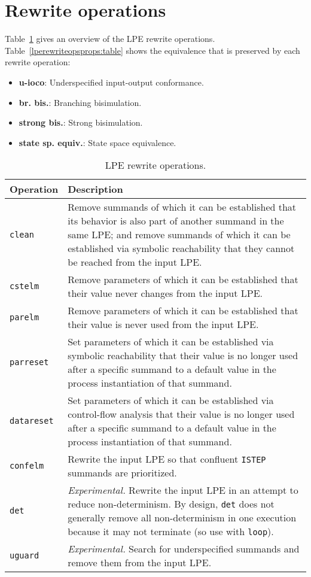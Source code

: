 \section{Rewrite operations}

Table~\ref{lperewriteops:table} gives an overview of the LPE rewrite operations.
Table~\ref{lperewriteopsprops:table} shows the equivalence that is preserved by each rewrite operation:
\begin{itemize}
\item \textbf{u-ioco}: Underspecified input-output conformance.
\item \textbf{br. bis.}: Branching bisimulation.
\item \textbf{strong bis.}: Strong bisimulation.
\item \textbf{state sp. equiv.}: State space equivalence.
\end{itemize}

\begin{table}[!ht]
\begin{center}
\begin{tabularx}{\linewidth}{l|X|}
\textbf{Operation} & \textbf{Description} \\ \hline
\texttt{clean} & Remove summands of which it can be established that its behavior is also part of another summand in the same LPE; and remove summands of which it can be established via symbolic reachability that they cannot be reached from the input LPE. \\ \hline
\texttt{cstelm} & Remove parameters of which it can be established that their value never changes from the input LPE. \\ \hline
\texttt{parelm} & Remove parameters of which it can be established that their value is never used from the input LPE. \\ \hline
\texttt{parreset} & Set parameters of which it can be established via symbolic reachability that their value is no longer used after a specific summand to a default value in the process instantiation of that summand. \\ \hline
\texttt{datareset} & Set parameters of which it can be established via control-flow analysis that their value is no longer used after a specific summand to a default value in the process instantiation of that summand. \\ \hline
\texttt{confelm} & Rewrite the input LPE so that confluent \texttt{ISTEP} summands are prioritized. \\ \hline
\texttt{det} & \textit{Experimental.} Rewrite the input LPE in an attempt to reduce non-determinism. By design, \texttt{det} does not generally remove all non-determinism in one execution because it may not terminate (so use with \texttt{loop}). \\ \hline
\texttt{uguard} & \textit{Experimental.} Search for underspecified summands and remove them from the input LPE. \\ \hline
\end{tabularx}
\caption{LPE rewrite operations.}
\label{lperewriteops:table}
\end{center}
\end{table}

